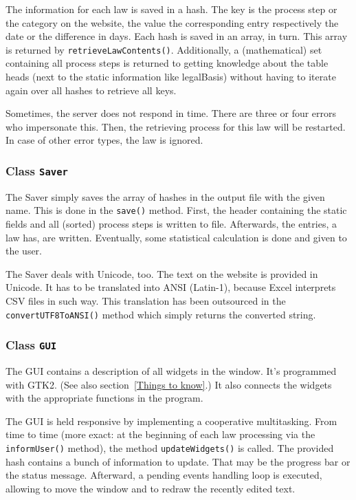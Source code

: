 \documentclass{scrartcl}
\begin{document}
The information for each law is saved in a hash. The key is the process step or the category on the website, the value the corresponding entry respectively the date or the difference in days. Each hash is saved in an array, in turn. This array is returned by \texttt{retrieveLawContents()}. Additionally, a (mathematical) set containing all process steps is returned to getting knowledge about the table heads (next to the static information like legalBasis) without having to iterate again over all hashes to retrieve all keys.

Sometimes, the server does not respond in time. There are three or four errors who impersonate this. Then, the retrieving process for this law will be restarted. In case of other error types, the law is ignored.



\subsubsection{Class \texttt{Saver}}
The Saver simply saves the array of hashes in the output file with the given name. This is done in the \texttt{save()} method. First, the header containing the static fields and all (sorted) process steps is written to file. Afterwards, the entries, a law has, are written. Eventually, some statistical calculation is done and given to the user.

The Saver deals with Unicode, too. The text on the website is provided in Unicode. It has to be translated into ANSI (Latin-1), because Excel interprets CSV files in such way. This translation has been outsourced in the \texttt{convertUTF8ToANSI()} method which simply returns the converted string.



\subsubsection{Class \texttt{GUI}}
The GUI contains a description of all widgets in the window. It's programmed with GTK2. (See also section~\ref{Things to know}.) It also connects the widgets with the appropriate functions in the program.

The GUI is held responsive by implementing a cooperative multitasking. From time to time (more exact: at the beginning of each law processing via the \texttt{informUser()} method), the method \texttt{updateWidgets()} is called. The provided hash contains a bunch of information to update. That may be the progress bar or the status message. Afterward, a pending events handling loop is executed, allowing to move the window and to redraw the recently edited text.
\end{document}
